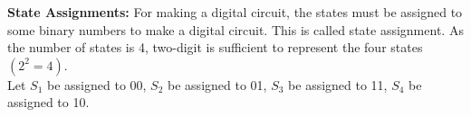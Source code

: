 \documentclass{article}
\begin{document}
\textbf{State Assignments:} For making a digital circuit, the states must be assigned to some binary numbers to
make a digital circuit. This is called state assignment. As the number of states is 4, two-digit is sufficient
to represent the four states $(2^2 = 4)$.\\
\hspace*{0.5cm} Let $S_1$ be assigned to 00, $S_2$ be assigned to 01, $S_3$ be assigned to 11, $S_4$ be assigned to 10.
\end{document}
